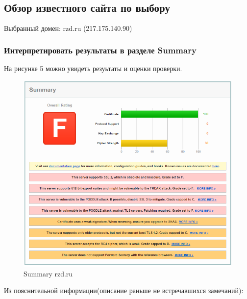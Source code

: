 \documentclass[11pt, a4paper]{article}		%
\begin{document}

\subsection{Обзор известного сайта по выбору}

Выбранный домен: rzd.ru (217.175.140.90)


\subsubsection{Интерпретировать результаты в разделе Summary}

На рисунке 5 можно увидеть резуьтаты и оценки проверки.


\begin{figure}[h!]
\centering
\includegraphics[scale=0.8]{res/5}
\caption{Summary rzd.ru}
\end{figure}

Из пояснительной информации(описание раньше не встречавшихся замечаний):
\end{document}
